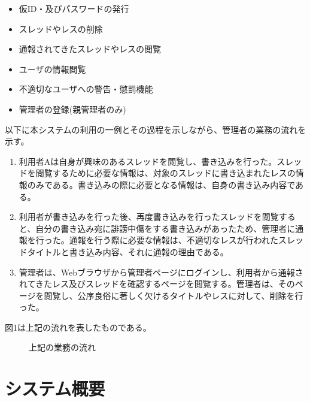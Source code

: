\documentclass[a4j]{jarticle}
\begin{document}
\begin{itemize}
  \item 仮ID・及びパスワードの発行
  \item スレッドやレスの削除
  \item 通報されてきたスレッドやレスの閲覧
  \item ユーザの情報閲覧
  \item 不適切なユーザへの警告・懲罰機能
  \item 管理者の登録(親管理者のみ)
\end{itemize}





以下に本システムの利用の一例とその過程を示しながら、管理者の業務の流れを示す。

\begin{enumerate}
  \item 利用者Aは自身が興味のあるスレッドを閲覧し、書き込みを行った。スレッドを閲覧するために必要な情報は、対象のスレッドに書き込まれたレスの情報のみである。書き込みの際に必要となる情報は、自身の書き込み内容である。

  \item  利用者が書き込みを行った後、再度書き込みを行ったスレッドを閲覧すると、自分の書き込み宛に誹謗中傷をする書き込みがあったため、管理者に通報を行った。通報を行う際に必要な情報は、不適切なレスが行われたスレッドタイトルと書き込み内容、それに通報の理由である。
  \item  管理者は、Webブラウザから管理者ページにログインし、利用者から通報されてきたレス及びスレッドを確認するページを閲覧する。管理者は、そのページを閲覧し、公序良俗に著しく欠けるタイトルやレスに対して、削除を行った。
\end{enumerate}

図1は上記の流れを表したものである。


\begin{figure}[h!]
\begin{center}
\caption{上記の業務の流れ}
\label{fig:figuretest}
\end{center}
\end{figure}














\section{システム概要}
\end{document}
